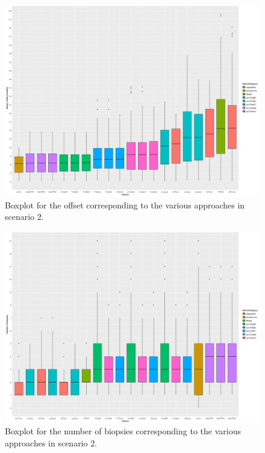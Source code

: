 \begin{figure}[H]
\centering
\captionsetup{justification=centering}
\includegraphics[width=\textwidth]{sim_study_res_sc_6_sh_1pt5/offset_boxplot.png}
\caption{\label{fig : sc_6_sh_1pt5_offset_boxplot} Boxplot for the offset corresponding to the various approaches in scenario 2.}
\end{figure}

\begin{figure}[H]
\centering
\captionsetup{justification=centering}
\includegraphics[width=\textwidth]{sim_study_res_sc_6_sh_1pt5/nb_boxplot.png}
\caption{\label{fig : sc_6_sh_1pt5_nb_boxplot} Boxplot for the number of biopsies corresponding to the various approaches in scenario 2.}
\end{figure}

